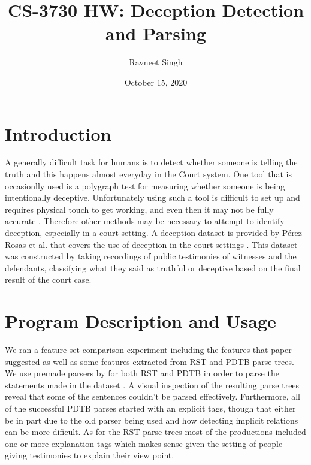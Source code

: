 \documentclass[12pt]{article}
\title{CS-3730 HW: Deception Detection and Parsing}
\author{Ravneet Singh}
\date{October 15, 2020}
\begin{document}
\maketitle

\section{Introduction}
A generally difficult task for humans is to detect whether someone is telling
the truth and this happens almost everyday in the Court system. One tool that is
occasionlly used is a polygraph test for measuring whether someone is being
intentionally deceptive. Unfortunately using such a tool is difficult to set up
and requires physical touch to get working, and even then it may not be fully
accurate \cite{iaconoAccuracyPolygraphTechniques2008}. Therefore other methods may be necessary
to attempt to identify deception, especially in a court setting. A deception
dataset is provided by P\'{e}rez-Rosas et al. that covers the use of deception
in the court settings \cite{perez-rosasDeceptionDetectionUsing2015}. This dataset was
constructed by taking recordings of public testimonies of witnesses and the
defendants, classifying what they said as truthful or deceptive based on the
final result of the court case. 

\section{Program Description and Usage}
We ran a feature set comparison experiment including the features that paper
suggested as well as some features extracted from RST and PDTB parse trees. We
use premade parsers by for both RST and PDTB in order to parse the statements
made in the dataset \cite{linPDTBstyledEndtoendDiscourse2014,
  fengTwopassDiscourseSegmentation2014, fengLinearTimeBottomUpDiscourse2014}.
A visual inspection of the resulting parse trees reveal that some of the
sentences couldn't be parsed effectively. Furthermore, all of the successful PDTB
parses started with an explicit tags, though that either be in part due to the
old parser being used and how detecting implicit relations can be more dificult.
As for the RST parse trees most of the productions included one or more
explanation tags which makes sense given the setting of people giving
testimonies to explain their view point.
\end{document}
